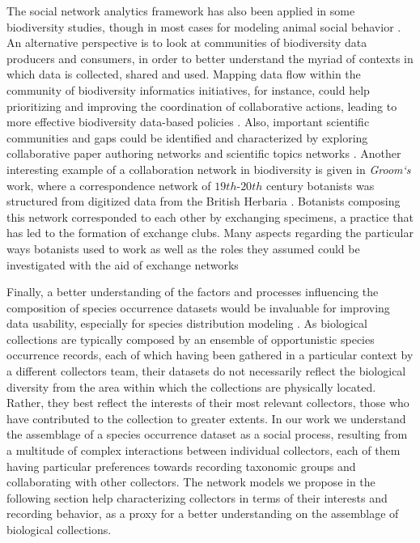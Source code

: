 {%
The social network analytics framework has also been applied in some biodiversity studies, though in most cases for modeling animal social behavior \cite{faust2011animal}.
An alternative perspective is to look at communities of biodiversity data producers and consumers, in order to better understand the myriad of contexts in which data is collected, shared and used.
%
Mapping data flow within the community of biodiversity informatics initiatives, for instance, could help prioritizing and improving the coordination of collaborative actions, leading to more effective biodiversity data-based policies \cite{Bingham2017}.
%
Also, important scientific communities and gaps could be identified and characterized by exploring collaborative paper authoring networks and scientific topics networks \cite{Borrett2014}. 
%
Another interesting example of a collaboration network in biodiversity is given in \textit{Groom`s} work, where a correspondence network of $19th$-$20th$ century botanists was structured from digitized data from the British Herbaria \cite{Groom2014}.
Botanists composing this network corresponded to each other by exchanging specimens, a practice that has led to the formation of exchange clubs.
Many aspects regarding the particular ways botanists used to work as well as the roles they assumed could be investigated with the aid of exchange networks 

Finally, a better understanding of the factors and processes influencing the composition of species occurrence datasets would be invaluable for improving data usability, especially for species distribution modeling \cite{Daru2017}.
As biological collections are typically composed by an ensemble of opportunistic species occurrence records, each of which having been gathered in a particular context by a different collectors team, their datasets do not necessarily reflect the biological diversity from the area within which the collections are physically located.
Rather, they best reflect the interests of their most relevant collectors, those who have contributed to the collection to greater extents. 
%
In our work we understand the assemblage of a species occurrence dataset as a social process, resulting from a multitude of complex interactions between individual collectors, each of them having particular preferences towards recording taxonomic groups and collaborating with other collectors.
The network models we propose in the following section help characterizing collectors in terms of their interests and recording behavior, as a proxy for a better understanding on the assemblage of biological collections.
  




}
